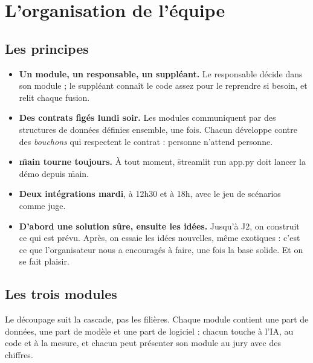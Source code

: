 \chapter{L'organisation de l'équipe}
\label{ch:organisation}

\section{Les principes}

\begin{itemize}
  \item \textbf{Un module, un responsable, un suppléant.} Le responsable décide dans son module ;
        le suppléant connaît le code assez pour le reprendre si besoin, et relit chaque fusion.
  \item \textbf{Des contrats figés lundi soir.} Les modules communiquent par des structures de
        données définies ensemble, une fois. Chacun développe contre des \emph{bouchons} qui
        respectent le contrat : personne n'attend personne.
  \item \textbf{\f{main} tourne toujours.} À tout moment, \f{streamlit run app.py} doit lancer la
        démo depuis \f{main}.
  \item \textbf{Deux intégrations mardi}, à 12h30 et à 18h, avec le jeu de scénarios comme juge.
  \item \textbf{D'abord une solution sûre, ensuite les idées.} Jusqu'à J2, on construit ce qui est
        prévu. Après, on essaie les idées nouvelles, même exotiques : c'est ce que l'organisateur
        nous a encouragés à faire, une fois la base solide. Et on se fait plaisir.
\end{itemize}

\section{Les trois modules}

Le découpage suit la cascade, pas les filières. Chaque module contient une part de données, une
part de modèle et une part de logiciel : chacun touche à l'IA, au code et à la mesure, et chacun
peut présenter son module au jury avec des chiffres.

